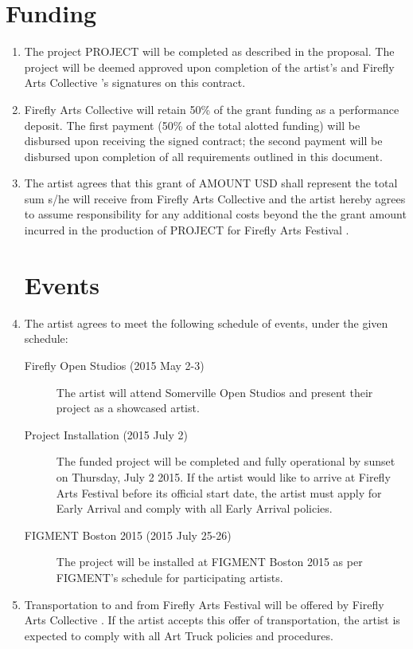 \documentclass[11pt]{article}
\newcommand{\project}{PROJECT }
\newcommand{\amount}{AMOUNT }
\newcommand{\fac}{Firefly Arts Collective }
\begin{document}
\section*{Funding}
\begin{enumerate}
\item The project \project will be completed as described in the proposal.  The project will be deemed approved upon
  completion of the artist's and \fac's signatures on this contract.

\item \fac will retain 50\% of the grant funding as a performance deposit.  The first payment (50\% of the total alotted
  funding) will be disbursed upon receiving the signed contract; the second payment will be disbursed upon completion of
  all requirements outlined in this document.

\item The artist agrees that this grant of \amount USD shall represent the total sum s/he will receive from \fac and the artist hereby
  agrees to assume responsibility for any additional costs beyond the the grant amount incurred in the production of
  \project for Firefly Arts Festival \the\year.

\section*{Events}
\item The artist agrees to meet the following schedule of events, under the given schedule:

  \begin{description}
    \item[Firefly Open Studios (2015 May 2-3)] The artist will attend Somerville Open Studios and present their project
      as a showcased artist.
    \item[Project Installation (2015 July 2)] The funded project will be completed and fully operational by sunset on
      Thursday, July 2 2015.  If the artist would like to arrive at Firefly Arts Festival before its official start
      date, the artist must apply for Early Arrival and comply with all Early Arrival policies.
    \item[FIGMENT Boston 2015 (2015 July 25-26)] The project will be installed at FIGMENT Boston 2015 as per FIGMENT's schedule for
      participating artists.
  \end{description}

\item Transportation to and from Firefly Arts Festival will be offered by \fac.  If the artist accepts this offer of
  transportation, the artist is expected to comply with all Art Truck policies and procedures.
  

\end{enumerate}
\end{document}
